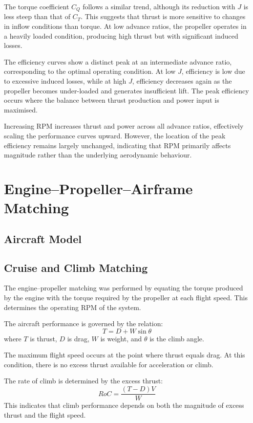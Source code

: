 \documentclass[a4paper,12pt]{article} %
\begin{document}
The torque coefficient $C_Q$ follows a similar trend, although its reduction with $J$ 
is less steep than that of $C_T$. This suggests that thrust is more sensitive to changes 
in inflow conditions than torque. At low advance ratios, the propeller operates in a 
heavily loaded condition, producing high thrust but with significant induced losses.

The efficiency curves show a distinct peak at an intermediate advance ratio, corresponding 
to the optimal operating condition. At low $J$, efficiency is low due to excessive induced 
losses, while at high $J$, efficiency decreases again as the propeller becomes under-loaded 
and generates insufficient lift. The peak efficiency occurs where the balance between thrust 
production and power input is maximised.

Increasing RPM increases thrust and power across all advance ratios, effectively scaling 
the performance curves upward. However, the location of the peak efficiency remains largely 
unchanged, indicating that RPM primarily affects magnitude rather than the underlying 
aerodynamic behaviour.


\section{Engine--Propeller--Airframe Matching}

\subsection{Aircraft Model}
\subsection{Cruise and Climb Matching}

The engine–propeller matching was performed by equating the torque produced by the engine with the torque required by the propeller at each flight speed. This determines the operating RPM of the system.

The aircraft performance is governed by the relation:
\[
T = D + W \sin \theta
\]
where $T$ is thrust, $D$ is drag, $W$ is weight, and $\theta$ is the climb angle.

The maximum flight speed occurs at the point where thrust equals drag. At this condition, there is no excess thrust available for acceleration or climb.

The rate of climb is determined by the excess thrust:
\[
RoC = \frac{(T - D)V}{W}
\]
This indicates that climb performance depends on both the magnitude of excess thrust and the flight speed.
\end{document}
